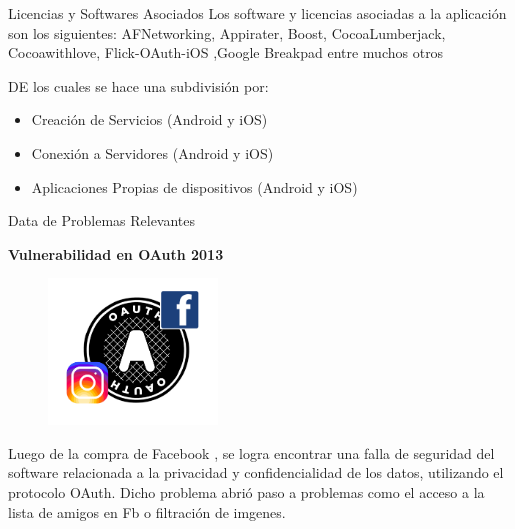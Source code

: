 \begin{frame}[t,fragile]{Licencias y Softwares Asociados}
Los software y licencias asociadas a la aplicación son los siguientes:
AFNetworking, Appirater, Boost, CocoaLumberjack, Cocoawithlove, Flick-OAuth-iOS
    ,Google Breakpad entre muchos otros
\bigskip


DE los cuales se hace una subdivisión por:

\begin{itemize}
    \item Creación de Servicios (Android y iOS)
    \item Conexión a Servidores (Android y iOS)
    \item Aplicaciones Propias de dispositivos (Android y iOS)
\end{itemize}



\end{frame}


\begin{frame}[t,fragile]{Data de Problemas Relevantes}

\textbf{Vulnerabilidad en OAuth 2013}


\begin{figure} 
\vspace{2pt}
  \begin{center}
    \includegraphics[width=0.4\textwidth]{oauth}
    \label{fig:databaseUserTable}
  \end{center}
  \vspace{2pt}
\end{figure} 

\bigskip

Luego de la compra de Facebook , se logra encontrar una falla de seguridad del software relacionada a la privacidad y confidencialidad de los datos, utilizando el protocolo OAuth. Dicho problema abrió paso a problemas como el acceso a la lista de amigos en Fb o filtración de imgenes.




\end{frame}

